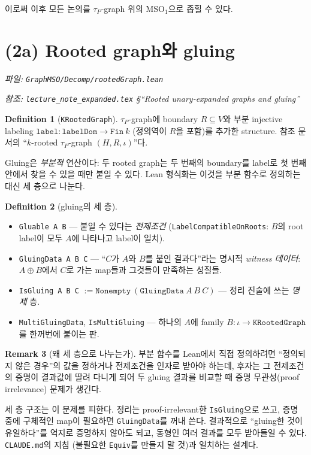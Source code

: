 \documentclass[11pt]{article}
\theoremstyle{definition}
\newtheorem{definition}{Definition}[section]
\newtheorem{remark}[definition]{Remark}
\theoremstyle{plain}
\newcommand{\MSOone}{\mathrm{MSO}_1}
\newcommand{\lean}[1]{\texttt{#1}}
\newcommand{\leanfile}[1]{\texttt{#1}}
\begin{document}
이로써 이후 모든 논의를 $\tau_P$-graph 위의 $\MSOone$으로 좁힐 수 있다.

\section{(2a) Rooted graph와 gluing}
\label{mso:sec:rooted}

\emph{파일: \leanfile{GraphMSO/Decomp/rootedGraph.lean}}

\emph{참조: \leanfile{lecture\_note\_expanded.tex}
\S``Rooted unary-expanded graphs and gluing''}

\begin{definition}[\lean{KRootedGraph}]
\label{mso:def:krootedgraph}
$\tau_P$-graph에 boundary $R \subseteq V$와 부분 injective labeling
$\lean{label} : \lean{labelDom} \to \lean{Fin}\ k$ (정의역이 $R$을 포함)를
추가한 structure. 참조 문서의 ``$k$-rooted $\tau_P$-graph $(H,R,\iota)$''다.
\end{definition}

Gluing은 \emph{부분적} 연산이다: 두 rooted graph는 두 번째의 boundary를
label로 첫 번째 안에서 찾을 수 있을 때만 붙일 수 있다. Lean 형식화는 이것을
부분 함수로 정의하는 대신 세 층으로 나눈다.

\begin{definition}[gluing의 세 층]
\label{mso:def:gluinglayers}
\begin{itemize}
  \item \lean{Gluable A B} --- 붙일 수 있다는 \emph{전제조건}
    (\lean{LabelCompatibleOnRoots}: $B$의 root label이 모두 $A$에 나타나고
    label이 일치).
  \item \lean{GluingData A B C} --- ``$C$가 $A$와 $B$를 붙인 결과다''라는
    명시적 \emph{witness 데이터}: $A \oplus B$에서 $C$로 가는 map들과 그것들이
    만족하는 성질들.
  \item \lean{IsGluing A B C} $:= \lean{Nonempty}\ (\lean{GluingData}\ A\ B\ C)$
    --- 정리 진술에 쓰는 \emph{명제} 층.
  \item \lean{MultiGluingData}, \lean{IsMultiGluing} --- 하나의 $A$에 family
    $B : \iota \to \lean{KRootedGraph}$를 한꺼번에 붙이는 판.
\end{itemize}
\end{definition}

\begin{remark}[왜 세 층으로 나누는가]
\label{mso:rem:whythreelayers}
부분 함수를 Lean에서 직접 정의하려면 ``정의되지 않은 경우''의 값을 정하거나
전제조건을 인자로 받아야 하는데, 후자는 그 전제조건의 증명이 결과값에 딸려
다니게 되어 두 gluing 결과를 비교할 때 증명 무관성(proof irrelevance) 문제가
생긴다.

세 층 구조는 이 문제를 피한다. 정리는 proof-irrelevant한 \lean{IsGluing}으로
쓰고, 증명 중에 구체적인 map이 필요하면 \lean{GluingData}를 꺼내 쓴다.
결과적으로 ``gluing한 것이 유일하다''를 억지로 증명하지 않아도 되고,
동형인 여러 결과를 모두 받아들일 수 있다. \leanfile{CLAUDE.md}의 지침
(불필요한 \lean{Equiv}를 만들지 말 것)과 일치하는 설계다.
\end{remark}
\end{document}
